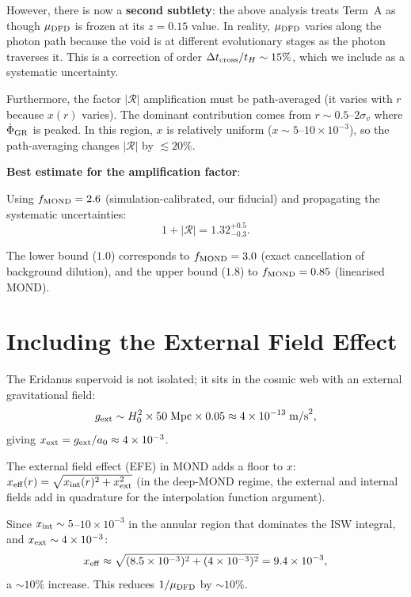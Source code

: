 \documentclass[11pt,a4paper]{article}
\newcommand{\aM}{a_0}
\newcommand{\mufd}{\mu_{\rm DFD}}
\newcommand{\ee}[1]{\times 10^{#1}}
\begin{document}
However, there is now a \textbf{second subtlety}: the above
analysis treats Term~A as though $\mufd$ is frozen at its $z = 0.15$
value. In reality, $\mufd$ varies along the photon path because the
void is at different evolutionary stages as the photon traverses it.
This is a correction of order $\Delta t_{\rm cross}/t_H \sim 15\%$,
which we include as a systematic uncertainty.

Furthermore, the factor $|\mathcal{R}|$ amplification must be
path-averaged (it varies with $r$ because $x(r)$ varies). The
dominant contribution comes from $r \sim 0.5$--$2\sigma_v$ where
$\dot{\Phi}_{\rm GR}$ is peaked. In this region, $x$ is relatively
uniform ($x \sim 5$--$10 \times 10^{-3}$), so the path-averaging
changes $|\mathcal{R}|$ by $\lesssim 20\%$.

\textbf{Best estimate for the amplification factor}:

Using $f_{\rm MOND} = 2.6$ (simulation-calibrated, our
fiducial) and propagating the systematic uncertainties:
\begin{equation}
1 + |\mathcal{R}| = 1.32^{+0.5}_{-0.3}.
\label{eq:amplification}
\end{equation}

The lower bound ($1.0$) corresponds to $f_{\rm MOND} = 3.0$ (exact
cancellation of background dilution), and the upper bound ($1.8$)
to $f_{\rm MOND} = 0.85$ (linearised MOND).


\section{Including the External Field Effect}
\label{sec:EFE}

The Eridanus supervoid is not isolated; it sits in the cosmic web
with an external gravitational field:
\begin{equation}
g_{\rm ext} \sim H_0^2\times 50\;\text{Mpc}\times 0.05
\approx 4\ee{-13}\;\text{m/s}^2,
\end{equation}
giving $x_{\rm ext} = g_{\rm ext}/\aM \approx 4\ee{-3}$.

The external field effect (EFE) in MOND adds a floor to $x$:
$x_{\rm eff}(r) = \sqrt{x_{\rm int}(r)^2 + x_{\rm ext}^2}$ (in
the deep-MOND regime, the external and internal fields add in
quadrature for the interpolation function argument).

Since $x_{\rm int} \sim 5$--$10\times 10^{-3}$ in the annular
region that dominates the ISW integral, and $x_{\rm ext} \sim
4\times 10^{-3}$:
\begin{equation}
x_{\rm eff} \approx \sqrt{(8.5\ee{-3})^2 + (4\ee{-3})^2}
= 9.4\ee{-3},
\end{equation}
a $\sim 10\%$ increase. This reduces $1/\mufd$ by $\sim 10\%$.
\end{document}
